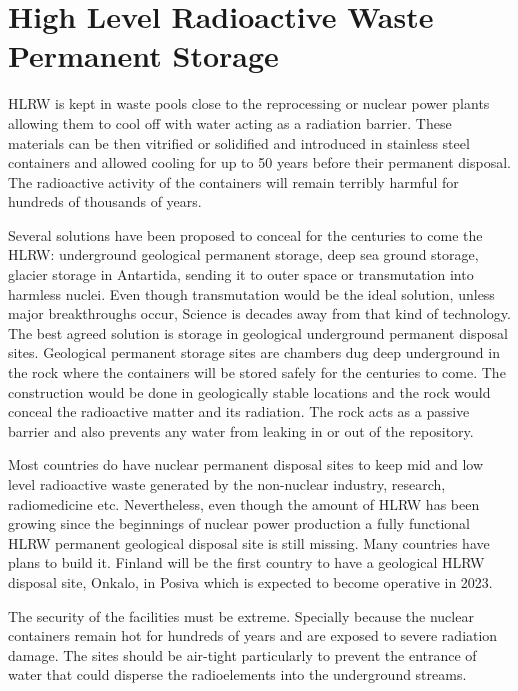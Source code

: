 \section{High Level Radioactive Waste Permanent Storage}

HLRW is kept in waste pools close to the reprocessing or nuclear power plants allowing them to 
cool off with water acting as a radiation barrier. These materials 
can be then vitrified or solidified and introduced in stainless steel containers and allowed 
cooling for up to 50 years before their permanent disposal. The radioactive activity of the 
containers will remain terribly harmful for hundreds of thousands of years. 

Several solutions have been proposed to conceal for the centuries to come the HLRW: underground 
geological permanent storage, deep sea ground storage, glacier storage in Antartida, sending it 
to 
outer space or transmutation into harmless nuclei. Even though transmutation would be the ideal 
solution, unless major breakthroughs occur, Science is decades away from that kind of 
technology. 
The best agreed solution is storage in geological underground permanent 
disposal sites. Geological permanent storage sites are chambers dug deep underground in the rock 
where the containers will be stored safely for the centuries to come. The construction would 
be done in geologically stable locations and the rock would conceal the radioactive matter 
and its radiation. The rock acts as a passive barrier and also prevents any water from
leaking in or out of the repository. 

Most countries do have nuclear permanent disposal sites to keep mid and low level radioactive waste 
generated by the non-nuclear industry, research, radiomedicine etc. Nevertheless, even though the 
amount of HLRW has been growing since the beginnings of nuclear power production  a fully functional 
HLRW permanent geological disposal site is still missing. Many countries have 
plans to build it. Finland will be the first country to have a geological HLRW disposal 
site, Onkalo, 
in Posiva which is expected to become operative in 2023.\cite{OECD-NEA-HLRW}

The security of the facilities must be extreme. Specially because the nuclear containers remain hot 
for hundreds of years and are exposed to severe radiation damage. The sites should be air-tight 
particularly to prevent the entrance of water that could disperse the radioelements into the 
underground streams. 

